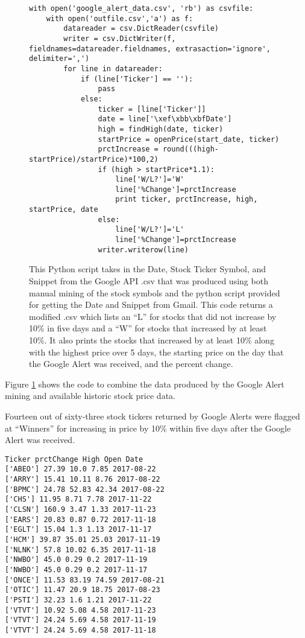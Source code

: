 \documentclass[sigconf]{acmart}
\begin{document}
\begin{figure}[htb]
\begin{verbatim}
with open('google_alert_data.csv', 'rb') as csvfile:
	with open('outfile.csv','a') as f:
		datareader = csv.DictReader(csvfile)
		writer = csv.DictWriter(f, fieldnames=datareader.fieldnames, extrasaction='ignore', delimiter=',')
		for line in datareader:
			if (line['Ticker'] == ''):
				pass
			else:
				ticker = [line['Ticker']]
				date = line['\xef\xbb\xbfDate']
				high = findHigh(date, ticker)
				startPrice = openPrice(start_date, ticker)
				prctIncrease = round(((high-startPrice)/startPrice)*100,2)
				if (high > startPrice*1.1):
					line['W/L?']='W'
					line['%Change']=prctIncrease
					print ticker, prctIncrease, high, startPrice, date
				else:
					line['W/L?']='L'
					line['%Change']=prctIncrease
				writer.writerow(line) 
\end{verbatim}
\caption{This Python script takes in the Date, Stock Ticker Symbol, and Snippet from the Google API .csv that was produced using both manual mining of the stock symbols and the python script provided for getting the Date and Snippet from Gmail. This code returns a modified .csv which lists an ``L'' for stocks that did not increase by 10\% in five days and a ``W'' for stocks that increased by at least 10\%. It also prints the stocks that increased by at least 10\% along with the highest price over 5 days, the starting price on the day that the Google Alert was received, and the percent change.}\label{c:stock}
\end{figure}

Figure \ref{c:stock} shows the code to combine the data produced by the Google Alert mining and available historic stock price data.

Fourteen out of sixty-three stock tickers returned by Google Alerts were flagged at ``Winners'' for increasing in price by 10\% within five days after the Google Alert was received. 
\begin{mdframed}[style=default]
\begin{lstlisting}
Ticker prctChange High Open Date
['ABEO'] 27.39 10.0 7.85 2017-08-22
['ARRY'] 15.41 10.11 8.76 2017-08-22
['BPMC'] 24.78 52.83 42.34 2017-08-22
['CHS'] 11.95 8.71 7.78 2017-11-22
['CLSN'] 160.9 3.47 1.33 2017-11-23
['EARS'] 20.83 0.87 0.72 2017-11-18
['EGLT'] 15.04 1.3 1.13 2017-11-17
['HCM'] 39.87 35.01 25.03 2017-11-19
['NLNK'] 57.8 10.02 6.35 2017-11-18
['NWBO'] 45.0 0.29 0.2 2017-11-19
['NWBO'] 45.0 0.29 0.2 2017-11-17
['ONCE'] 11.53 83.19 74.59 2017-08-21
['OTIC'] 11.47 20.9 18.75 2017-08-23
['PSTI'] 32.23 1.6 1.21 2017-11-22
['VTVT'] 10.92 5.08 4.58 2017-11-23
['VTVT'] 24.24 5.69 4.58 2017-11-19
['VTVT'] 24.24 5.69 4.58 2017-11-18
\end{lstlisting}
\end{mdframed}
\end{document}
